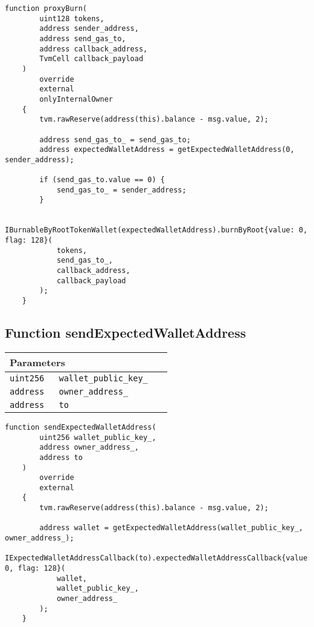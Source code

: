\begin{lstlisting}[firstnumber=307]
    function proxyBurn(
        uint128 tokens,
        address sender_address,
        address send_gas_to,
        address callback_address,
        TvmCell callback_payload
    )
        override
        external
        onlyInternalOwner
    {
        tvm.rawReserve(address(this).balance - msg.value, 2);

        address send_gas_to_ = send_gas_to;
        address expectedWalletAddress = getExpectedWalletAddress(0, sender_address);

        if (send_gas_to.value == 0) {
            send_gas_to_ = sender_address;
        }

        IBurnableByRootTokenWallet(expectedWalletAddress).burnByRoot{value: 0, flag: 128}(
            tokens,
            send_gas_to_,
            callback_address,
            callback_payload
        );
    }
\end{lstlisting}

\subsection{Function sendExpectedWalletAddress}


\ifsoltables
\noindent\begin{tabular}{|l|l|p{5cm}|}\hline
\multicolumn{3}{|l|}{\bf Parameters}\\\hline
\tt uint256 & \tt wallet\_{}public\_{}key\_{} &\\\hline
\tt address & \tt owner\_{}address\_{} &\\\hline
\tt address & \tt to &\\\hline
\end{tabular}
\fi

\vspace{2cm}

\begin{lstlisting}[firstnumber=134]
    function sendExpectedWalletAddress(
        uint256 wallet_public_key_,
        address owner_address_,
        address to
    )
        override
        external
    {
        tvm.rawReserve(address(this).balance - msg.value, 2);

        address wallet = getExpectedWalletAddress(wallet_public_key_, owner_address_);
        IExpectedWalletAddressCallback(to).expectedWalletAddressCallback{value: 0, flag: 128}(
            wallet,
            wallet_public_key_,
            owner_address_
        );
    }
\end{lstlisting}

